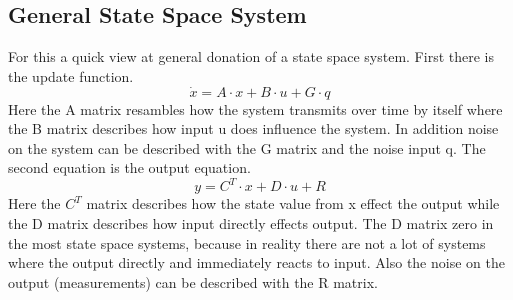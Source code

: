   \subsection{General State Space System}
  For this a quick view at general donation of a state space system. First there is the update function.
  $$ \dot{x} = A \cdot x + B \cdot u + G \cdot q$$
  Here the A matrix resambles how the system transmits over time by itself where the B matrix describes how input u does influence the system.
  In addition noise on the system can be described with the G matrix and the noise input q.
  The second equation is the output equation.
  $$ y = C^T \cdot x + D \cdot u + R $$
  Here the $C^T$ matrix describes how the state value from x effect the output while the D matrix describes how input directly effects output.
  The D matrix zero in the most state space systems, because in reality there are not a lot of systems where the output directly and immediately reacts to input.
  Also the noise on the output (measurements) can be described with the R matrix.
  
